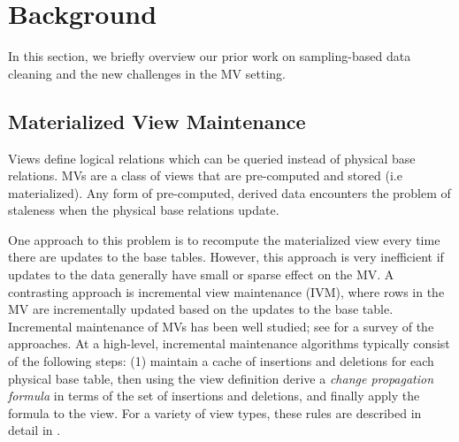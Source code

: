 \section{Background}\label{sec-background}
In this section, we briefly overview our prior work on sampling-based data cleaning and the new challenges in the MV setting.


\iffalse
\subsection{Materialized View Maintenance}\label{subsec-inc}
Views define logical relations which can be queried instead of physical base relations.
MVs are a class of views that are pre-computed and stored (i.e materialized).
Any form of pre-computed, derived data encounters the problem of staleness when the physical base relations update.

One approach to this problem is to recompute the materialized view every time there are updates to the base tables.
However, this approach is very inefficient if updates to the data generally have small or sparse effect on the MV. 
A contrasting approach is incremental view maintenance (IVM), where rows in the MV are incrementally updated based on the updates to the base table.
Incremental maintenance of MVs has been well studied; see \cite{chirkova2011materialized} for a survey of the approaches. 
At a high-level, incremental maintenance algorithms typically consist of the following steps: (1) maintain a cache of insertions and deletions for each physical base table, then using the view definition derive a \emph{change propagation formula} in terms of the set of insertions and deletions, and finally apply the formula to the view.
For a variety of view types, these rules are described in detail in \cite{DBLP:journals/vldb/KochAKNNLS14, DBLP:conf/pods/Koch10}.



